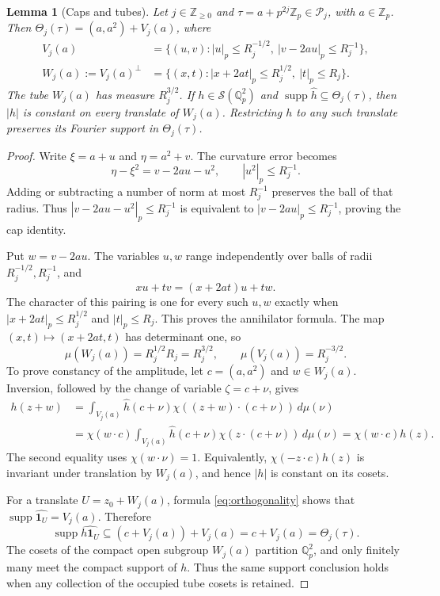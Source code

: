 \documentclass[11pt,twoside,a4paper]{article}
\numberwithin{equation}{section}
\newtheorem{lemma}[theorem]{Lemma}
\theoremstyle{definition}
\newcommand{\Q}{\mathbb Q_p}
\newcommand{\Z}{\mathbb Z_p}
\newcommand{\one}{\mathbf 1}
\newcommand{\cS}{\mathcal S}
\newcommand{\cP}{\mathcal P}
\newcommand{\supp}{\operatorname{supp}}
\begin{document}
\begin{lemma}[Caps and tubes]\label{lem:tubes}
Let $j\in\mathbb Z_{\ge0}$ and $\tau=a+p^{2j}\Z\in\cP_j$, with $a\in\Z$. Then $\Theta_j(\tau)=(a,a^2)+V_j(a)$, where
$$
\begin{aligned}
V_j(a)&=\{(u,v):|u|_p\le R_j^{-1/2},\ |v-2au|_p\le R_j^{-1}\},\\
W_j(a):=V_j(a)^\perp
&=\{(x,t):|x+2at|_p\le R_j^{1/2},\ |t|_p\le R_j\}.
\end{aligned}
$$
The tube $W_j(a)$ has measure $R_j^{3/2}$. If $h\in\cS(\Q^2)$ and $\supp\widehat h\subseteq\Theta_j(\tau)$, then $|h|$ is constant on every translate of $W_j(a)$. Restricting $h$ to any such translate preserves its Fourier support in $\Theta_j(\tau)$.
\end{lemma}
\begin{proof}
Write $\xi=a+u$ and $\eta=a^2+v$. The curvature error becomes
$$
\eta-\xi^2=v-2au-u^2,\qquad |u^2|_p\le R_j^{-1}.
$$
Adding or subtracting a number of norm at most $R_j^{-1}$ preserves the ball of that radius. Thus $|v-2au-u^2|_p\le R_j^{-1}$ is equivalent to $|v-2au|_p\le R_j^{-1}$, proving the cap identity.

Put $w=v-2au$. The variables $u,w$ range independently over balls of radii $R_j^{-1/2},R_j^{-1}$, and
$$
xu+tv=(x+2at)u+tw.
$$
The character of this pairing is one for every such $u,w$ exactly when $|x+2at|_p\le R_j^{1/2}$ and $|t|_p\le R_j$. This proves the annihilator formula. The map $(x,t)\mapsto(x+2at,t)$ has determinant one, so
$$
\mu(W_j(a))=R_j^{1/2}R_j=R_j^{3/2},\qquad
\mu(V_j(a))=R_j^{-3/2}.
$$
To prove constancy of the amplitude, let $c=(a,a^2)$ and $w\in W_j(a)$. Inversion, followed by the change of variable $\zeta=c+\nu$, gives
$$
\begin{aligned}
h(z+w)
&=\int_{V_j(a)}\widehat h(c+\nu)\chi((z+w)\cdot(c+\nu))\,d\mu(\nu)\\
&=\chi(w\cdot c)\int_{V_j(a)}\widehat h(c+\nu)\chi(z\cdot(c+\nu))\,d\mu(\nu)
=\chi(w\cdot c)h(z).
\end{aligned}
$$
The second equality uses $\chi(w\cdot\nu)=1$. Equivalently, $\chi(-z\cdot c)h(z)$ is invariant under translation by $W_j(a)$, and hence $|h|$ is constant on its cosets.

For a translate $U=z_0+W_j(a)$, formula \eqref{eq:orthogonality} shows that $\supp\widehat{\one_U}=V_j(a)$. Therefore
$$
\supp\widehat{h\one_U}
\subseteq(c+V_j(a))+V_j(a)=c+V_j(a)=\Theta_j(\tau).
$$
The cosets of the compact open subgroup $W_j(a)$ partition $\Q^2$, and only finitely many meet the compact support of $h$. Thus the same support conclusion holds when any collection of the occupied tube cosets is retained.
\end{proof}
\end{document}
